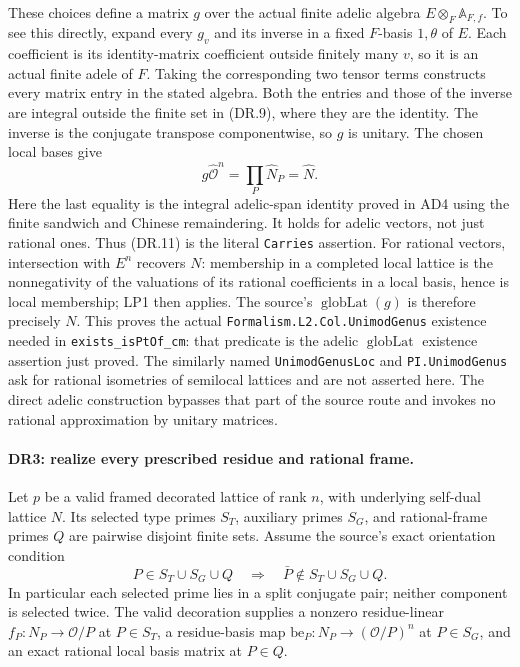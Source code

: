 These choices define a matrix $g$ over the actual finite adelic
algebra $E\otimes_F\mathbb A_{F,f}$. To see this directly, expand
every $g_v$ and its inverse in a fixed $F$-basis $1,\theta$ of $E$.
Each coefficient is its identity-matrix coefficient outside finitely
many $v$, so it is an actual finite adele of $F$. Taking the corresponding
two tensor terms constructs every matrix entry in the stated algebra.
Both the entries and those of the inverse are integral outside the
finite set in (DR.9), where they are the identity.
The inverse is the conjugate transpose
componentwise, so $g$ is unitary. The chosen local bases give
\[
          g\widehat{\mathcal O}^{n}
                    =\prod_P\widehat N_P=\widehat N.
 \tag{DR.11}
\]
Here the last equality is the integral adelic-span identity proved
in AD4 using the finite sandwich and Chinese remaindering. It holds
for adelic vectors, not just rational ones. Thus (DR.11) is the
literal \texttt{Carries} assertion.
For rational vectors, intersection with $E^n$ recovers $N$: membership
in a completed local lattice is the nonnegativity of the valuations
of its rational coefficients in a local basis, hence is local
membership; LP1 then applies. The source's
$\operatorname{globLat}(g)$ is therefore precisely $N$.
This proves the actual \texttt{Formalism.L2.Col.UnimodGenus}
existence needed in \texttt{exists\_isPtOf\_cm}: that predicate is
the adelic $\operatorname{globLat}$ existence assertion just proved.
The similarly named \texttt{UnimodGenusLoc} and
\texttt{PI.UnimodGenus} ask for rational isometries of semilocal
lattices and are not asserted here. The direct adelic construction
bypasses that part of the source route and invokes no rational
approximation by unitary matrices.

\paragraph{DR3: realize every prescribed residue and rational frame.}
Let $p$ be a valid framed decorated lattice of rank $n$, with
underlying self-dual lattice $N$. Its selected type primes $S_T$,
auxiliary primes $S_G$, and rational-frame primes $Q$ are pairwise
disjoint finite sets. Assume the source's exact orientation condition
\[
 P\in S_T\cup S_G\cup Q
       \quad\Longrightarrow\quad
 \bar P\notin S_T\cup S_G\cup Q.                    \tag{DR.12}
\]
In particular each selected prime lies in a split conjugate pair;
neither component is selected twice. The valid decoration supplies
a nonzero residue-linear $f_P:N_P\to\mathcal O/P$ at $P\in S_T$,
a residue-basis map $\mathrm{be}_P:N_P\to(\mathcal O/P)^n$ at
$P\in S_G$, and an exact rational local basis matrix at $P\in Q$.

